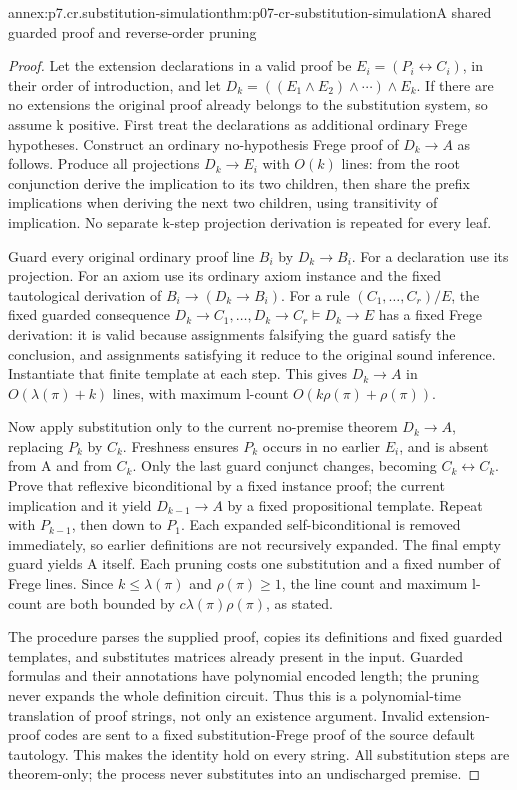 \begin{annexitem}{annex:p7.cr.substitution-simulation}{thm:p07-cr-substitution-simulation}{A shared guarded proof and reverse-order pruning}
\begin{proof}
Let the extension declarations in a valid proof be
\(E_i=(P_i\leftrightarrow C_i)\), in their order of introduction,
and let \(D_k=((E_1\land E_2)\land\cdots)\land E_k\).
If there are no extensions the original proof already belongs
to the substitution system, so assume k positive.
First treat the declarations as additional ordinary Frege hypotheses.
Construct an ordinary no-hypothesis Frege proof of \(D_k\to A\)
as follows. Produce all projections \(D_k\to E_i\) with
\(O(k)\) lines: from the root conjunction derive the implication
to its two children, then share the prefix implications when
deriving the next two children, using transitivity of implication.
No separate k-step projection derivation is repeated for every leaf.

Guard every original ordinary proof line \(B_i\) by
\(D_k\to B_i\). For a declaration use its projection. For an
axiom use its ordinary axiom instance and the fixed tautological
derivation of \(B_i\to(D_k\to B_i)\). For a rule
\((C_1,\ldots,C_r)/E\), the fixed guarded consequence
\(D_k\to C_1,\ldots,D_k\to C_r\models D_k\to E\)
has a fixed Frege derivation: it is valid because assignments
falsifying the guard satisfy the conclusion, and assignments
satisfying it reduce to the original sound inference.
Instantiate that finite template at each step. This gives
\(D_k\to A\) in \(O(\lambda(\pi)+k)\) lines, with
maximum l-count \(O(k\rho(\pi)+\rho(\pi))\).

Now apply substitution only to the current no-premise theorem
\(D_k\to A\), replacing \(P_k\) by \(C_k\).
Freshness ensures \(P_k\) occurs in no earlier \(E_i\),
and is absent from A and from \(C_k\). Only the last guard
conjunct changes, becoming \(C_k\leftrightarrow C_k\).
Prove that reflexive biconditional by a fixed instance proof;
the current implication and it yield \(D_{k-1}\to A\)
by a fixed propositional template. Repeat with \(P_{k-1}\),
then down to \(P_1\). Each expanded self-biconditional is
removed immediately, so earlier definitions are not recursively
expanded. The final empty guard yields A itself. Each pruning
costs one substitution and a fixed number of Frege lines.
Since \(k\leq\lambda(\pi)\) and \(\rho(\pi)\geq1\),
the line count and maximum l-count are both bounded by
\(c\lambda(\pi)\rho(\pi)\), as stated.

The procedure parses the supplied proof, copies its definitions
and fixed guarded templates, and substitutes matrices already
present in the input. Guarded formulas and their annotations
have polynomial encoded length; the pruning never expands the
whole definition circuit. Thus this is a polynomial-time
translation of proof strings, not only an existence argument.
Invalid extension-proof codes are sent to a fixed substitution-Frege
proof of the source default tautology. This makes the identity
hold on every string. All substitution steps are theorem-only;
the process never substitutes into an undischarged premise.
\end{proof}
\end{annexitem}

